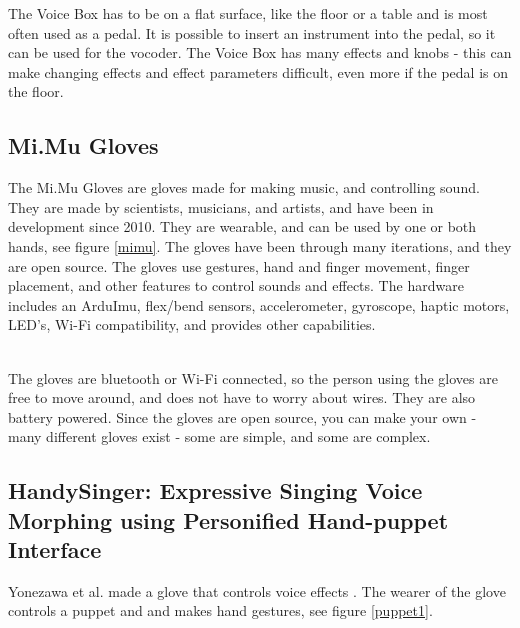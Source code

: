 The Voice Box has to be on a flat surface, like the floor or a table and is most often used as a pedal. It is possible to insert an instrument into the pedal, so it can be used for the vocoder. The Voice Box has many effects and knobs - this can make changing effects and effect parameters difficult, even more if the pedal is on the floor.

\subsection{Mi.Mu Gloves}

The Mi.Mu Gloves are gloves made for making music, and controlling sound\citep{Mimu}. They are made by scientists, musicians, and artists, and have been in development since 2010. They are wearable, and can be used by one or both hands, see figure \ref{mimu}. The gloves have been through many iterations, and they are open source. The gloves use gestures, hand and finger movement, finger placement, and other features to control sounds and effects. The hardware includes an ArduImu, flex/bend sensors, accelerometer, gyroscope, haptic motors, LED's, Wi-Fi compatibility, and provides other capabilities.\\

\begin{minipage}{\linewidth}%
\label{mimu}
\end{minipage}\\

The gloves are bluetooth or Wi-Fi connected, so the person using the gloves are free to move around, and does not have to worry about wires. They are also battery powered. 
Since the gloves are open source, you can make your own - many different gloves exist - some are simple, and some are complex.

\subsection{HandySinger: Expressive Singing Voice Morphing using Personified Hand-puppet Interface}

Yonezawa et al. made a glove that controls voice effects \citep{Yonezawa_2005}. The wearer of the glove controls a puppet and and makes hand gestures, see figure \ref{puppet1}. \\

